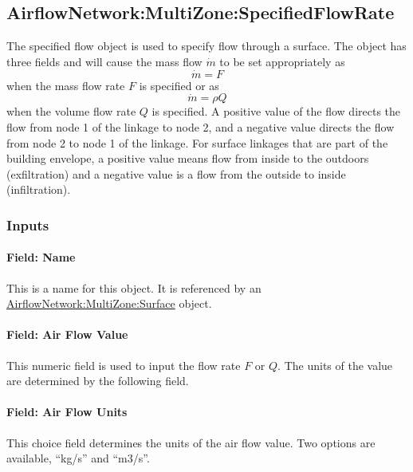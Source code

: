 \subsection{AirflowNetwork:MultiZone:SpecifiedFlowRate}\label{airflownetworkmultizonespecifiedflow}

The specified flow object is used to specify flow through a surface. The object has three fields
and will cause the mass flow $\dot m$ to be set appropriately as
%
\begin{equation}
\dot m = F
\end{equation}
%
when the mass flow rate $F$ is specified or as
%
\begin{equation}
\dot m = \rho Q
\end{equation}
%
when the volume flow rate $Q$ is specified. A positive value of the flow directs the flow from node 1
of the linkage to node 2, and a negative value directs the flow from node 2 to node 1 of the linkage.
For surface linkages that are part of the building envelope, a positive value means flow from inside
to the outdoors (exfiltration) and a negative value is a flow from the outside to inside (infiltration).

\subsubsection{Inputs}\label{inputs-sf}

\paragraph{Field: Name}\label{field-sf-name}

This is a name for this object. It is referenced by an \hyperref[airflownetworkmultizonesurface]{AirflowNetwork:MultiZone:Surface} object.

\paragraph{Field: Air Flow Value}\label{field-sf-air-flow-value}

This numeric field is used to input the flow rate $F$ or $Q$. The units of the value are determined by the following field.

\paragraph{Field: Air Flow Units}\label{field-sf-air-flow-units}

This choice field determines the units of the air flow value. Two options are available, ``kg/s'' and ``m3/s''.

